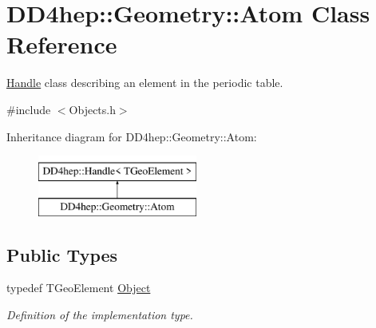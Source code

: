 \hypertarget{class_d_d4hep_1_1_geometry_1_1_atom}{}\section{D\+D4hep\+:\+:Geometry\+:\+:Atom Class Reference}
\label{class_d_d4hep_1_1_geometry_1_1_atom}


\hyperlink{class_d_d4hep_1_1_handle}{Handle} class describing an element in the periodic table.  




{\ttfamily \#include $<$Objects.\+h$>$}

Inheritance diagram for D\+D4hep\+:\+:Geometry\+:\+:Atom\+:\begin{figure}[H]
\begin{center}
\leavevmode
\includegraphics[height=2.000000cm]{class_d_d4hep_1_1_geometry_1_1_atom}
\end{center}
\end{figure}
\subsection*{Public Types}
\begin{DoxyCompactItemize}
\item 
typedef T\+Geo\+Element \hyperlink{class_d_d4hep_1_1_geometry_1_1_atom_a9fdd9fe52048018b3cba23bc9fb855fd}{Object}
\begin{DoxyCompactList}\small\item\em Definition of the implementation type. \end{DoxyCompactList}\end{DoxyCompactItemize}
